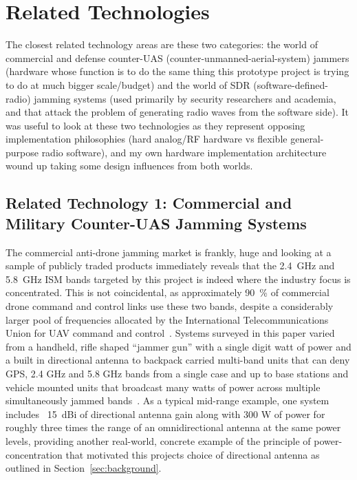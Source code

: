 \documentclass[12pt,a4paper]{report}
\begin{document}
	\section{Related Technologies}
	\label{sec:related-tech}
	The closest related technology areas are these two categories: the world of commercial and defense counter-UAS (counter-unmanned-aerial-system) jammers (hardware whose function is to do the same thing this prototype project is trying to do at much bigger scale/budget) and the world of SDR (software-defined-radio) jamming systems (used primarily by security researchers and academia, and that attack the problem of generating radio waves from the software side). It was useful to look at these two technologies as they represent opposing implementation philosophies (hard analog/RF hardware vs flexible general-purpose radio software), and my own hardware implementation architecture wound up taking some design influences from both worlds.
	
	\subsection{Related Technology 1: Commercial and Military Counter-UAS Jamming Systems}
	The commercial anti-drone jamming market is frankly, huge and looking at a sample of publicly traded products immediately reveals that the 2.4~GHz and 5.8~GHz ISM bands targeted by this project is indeed where the industry focus is concentrated. This is not coincidental, as approximately 90~\% of commercial drone command and control links use these two bands, despite a considerably larger pool of frequencies allocated by the International Telecommunications Union for UAV command and control~\cite{ref13}. Systems surveyed in this paper varied from a handheld, rifle shaped “jammer gun” with a single digit watt of power and a built in directional antenna to backpack carried multi-band units that can deny GPS, 2.4 GHz and 5.8 GHz bands from a single case and up to base stations and vehicle mounted units that broadcast many watts of power across multiple simultaneously jammed bands~\cite{ref11,ref12,ref13}. As a typical mid-range example, one system includes ~15~dBi of directional antenna gain along with 300 W of power for roughly three times the range of an omnidirectional antenna at the same power levels, providing another real-world, concrete example of the principle of power-concentration that motivated this projects choice of directional antenna as outlined in Section~\ref{sec:background}.
	
\end{document}
